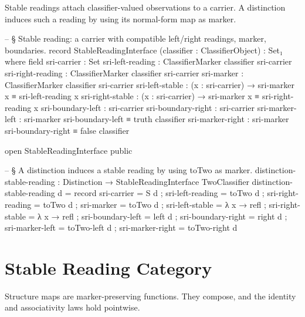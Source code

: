 \documentclass[11pt]{article}
\begin{document}
Stable readings attach classifier-valued observations to a carrier.  A
distinction induces such a reading by using its normal-form map
 as marker.

\begin{code}
-- § Stable reading: a carrier with compatible left/right readings, marker, boundaries.
record StableReadingInterface (classifier : ClassifierObject) : Set₁ where
  field
    sri-carrier        : Set
    sri-left-reading   : ClassifierMarker classifier sri-carrier
    sri-right-reading  : ClassifierMarker classifier sri-carrier
    sri-marker         : ClassifierMarker classifier sri-carrier
    sri-left-stable    : (x : sri-carrier) → sri-marker x ≡ sri-left-reading x
    sri-right-stable   : (x : sri-carrier) → sri-marker x ≡ sri-right-reading x
    sri-boundary-left  : sri-carrier
    sri-boundary-right : sri-carrier
    sri-marker-left    : sri-marker sri-boundary-left ≡ truth classifier
    sri-marker-right   : sri-marker sri-boundary-right ≡ false classifier

open StableReadingInterface public

-- § A distinction induces a stable reading by using toTwo as marker.
distinction-stable-reading : Distinction → StableReadingInterface TwoClassifier
distinction-stable-reading d = record
  { sri-carrier        = S d
  ; sri-left-reading   = toTwo d
  ; sri-right-reading  = toTwo d
  ; sri-marker         = toTwo d
  ; sri-left-stable    = λ x → refl
  ; sri-right-stable   = λ x → refl
  ; sri-boundary-left  = left d
  ; sri-boundary-right = right d
  ; sri-marker-left    = toTwo-left d
  ; sri-marker-right   = toTwo-right d
  }
\end{code}

\section{Stable Reading Category}

Structure maps are marker-preserving functions.  They compose, and the
identity and associativity laws hold pointwise.
\end{document}
